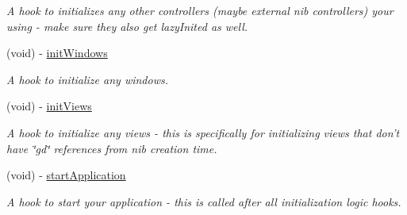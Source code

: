 \begin{DoxyCompactItemize}
\begin{DoxyCompactList}\small\item\em A hook to initializes any other controllers (maybe external nib controllers) your using -\/ make sure they also get lazyInited as well. \item\end{DoxyCompactList}\item 
\hypertarget{interface_g_d_application_controller_ace751aad934d79ef3f6bd2115aea17c2}{
(void) -\/ \hyperlink{interface_g_d_application_controller_ace751aad934d79ef3f6bd2115aea17c2}{initWindows}}
\label{interface_g_d_application_controller_ace751aad934d79ef3f6bd2115aea17c2}

\begin{DoxyCompactList}\small\item\em A hook to initialize any windows. \item\end{DoxyCompactList}\item 
(void) -\/ \hyperlink{interface_g_d_application_controller_aa966d71f7f1a9dea72eec302da43bf92}{initViews}
\begin{DoxyCompactList}\small\item\em A hook to initialize any views -\/ this is specifically for initializing views that don't have \char`\"{}gd\char`\"{} references from nib creation time. \item\end{DoxyCompactList}\item 
\hypertarget{interface_g_d_application_controller_a4add147ee3457d405b3ea8f33af37ef4}{
(void) -\/ \hyperlink{interface_g_d_application_controller_a4add147ee3457d405b3ea8f33af37ef4}{startApplication}}
\label{interface_g_d_application_controller_a4add147ee3457d405b3ea8f33af37ef4}

\begin{DoxyCompactList}\small\item\em A hook to start your application -\/ this is called after all initialization logic hooks. \item\end{DoxyCompactList}\end{DoxyCompactItemize}
